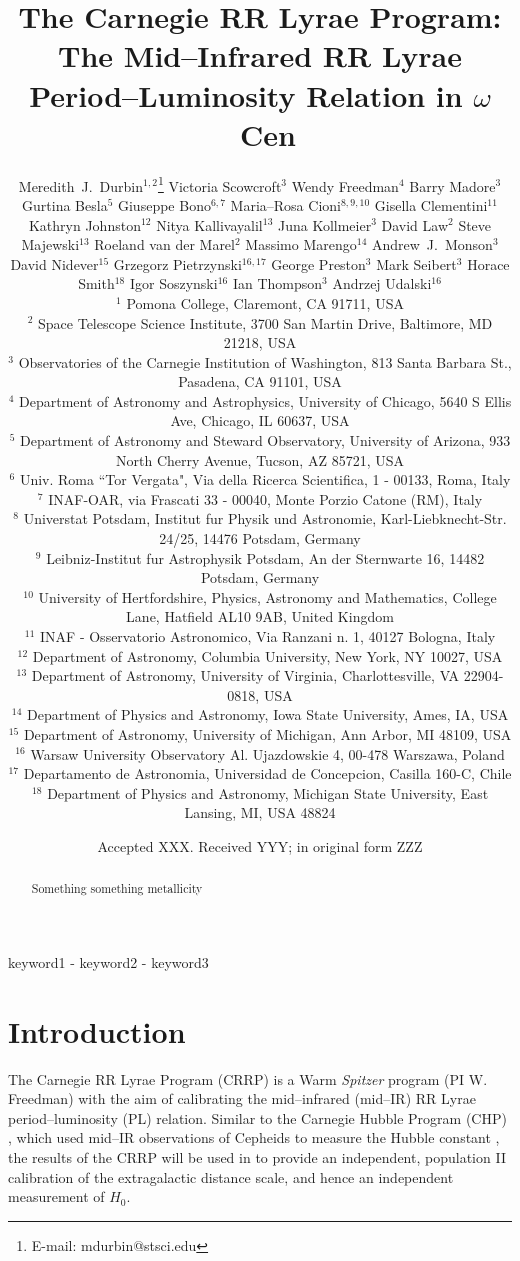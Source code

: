 \documentclass[a4paper,fleqn,usenatbib]{mnras}
\title[Mid--IR RR Lyrae PL Relation in $\omega$ Cen]{The Carnegie RR Lyrae Program: The Mid--Infrared RR Lyrae Period--Luminosity Relation in $\omega$~Cen}
\author[M.~J.~Durbin et al.]{Meredith~J.~Durbin$^{1,2}$\thanks{E-mail: mdurbin@stsci.edu}
Victoria Scowcroft$^{3}$
Wendy Freedman$^{4}$
Barry Madore$^{3}$
\newauthor Gurtina Besla$^{5}$ 
Giuseppe Bono$^{6, 7}$
Maria--Rosa Cioni$^{8, 9, 10}$
Gisella Clementini$^{11}$
\newauthor Kathryn Johnston$^{12}$
Nitya Kallivayalil$^{13}$
Juna Kollmeier$^{3}$
David Law$^{2}$
Steve Majewski$^{13}$
\newauthor Roeland van der Marel$^{2}$
Massimo Marengo$^{14}$
Andrew~J.~Monson$^{3}$
David Nidever$^{15}$ 
\newauthor
Grzegorz Pietrzynski$^{16, 17}$
George Preston$^{3}$
Mark Seibert$^{3}$
Horace Smith$^{18}$
\newauthor Igor Soszynski$^{16}$
Ian Thompson$^{3}$
Andrzej Udalski$^{16}$
\\
$^1$ Pomona College, Claremont, CA 91711, USA \\
$^2$ Space Telescope Science Institute, 3700 San Martin Drive, Baltimore, MD 21218, USA \\
$^3$ Observatories of the Carnegie Institution of Washington, 813 Santa Barbara St., Pasadena, CA 91101, USA \\
$^4$ Department of Astronomy and Astrophysics, University of Chicago, 5640 S Ellis Ave, Chicago, IL 60637, USA \\
$^5$ Department of Astronomy and Steward Observatory, University of Arizona, 933 North Cherry Avenue,   Tucson, AZ 85721, USA \\
$^6$ Univ. Roma ``Tor Vergata", Via della Ricerca Scientifica, 1 - 00133, Roma, Italy \\
$^7$ INAF-OAR, via Frascati 33 - 00040, Monte Porzio Catone (RM), Italy \\
$^8$ Universtat Potsdam, Institut fur Physik und Astronomie, Karl-Liebknecht-Str. 24/25, 14476 Potsdam, Germany \\
$^9$ Leibniz-Institut fur Astrophysik Potsdam, An der Sternwarte 16, 14482 Potsdam, Germany \\
$^{10}$ University of Hertfordshire, Physics, Astronomy and Mathematics, College Lane, Hatfield AL10 9AB, United Kingdom \\
$^{11}$ INAF - Osservatorio Astronomico, Via Ranzani n. 1, 40127 Bologna, Italy \\
$^{12}$ Department of Astronomy, Columbia University, New York, NY 10027, USA  \\
$^{13}$ Department of Astronomy, University of Virginia, Charlottesville, VA 22904-0818, USA \\
$^{14}$ Department of Physics and Astronomy, Iowa State University, Ames, IA, USA \\
$^{15}$ Department of Astronomy, University of Michigan, Ann Arbor, MI 48109, USA \\
$^{16}$ Warsaw University Observatory Al. Ujazdowskie 4, 00-478 Warszawa, Poland \\
$^{17}$ Departamento de Astronomia, Universidad de Concepcion, Casilla 160-C, Chile \\
$^{18}$ Department of Physics and Astronomy, Michigan State University, East Lansing, MI, USA 48824 \\
}
\date{Accepted XXX. Received YYY; in original form ZZZ}
\begin{document}
\label{firstpage}
\pagerange{\pageref{firstpage}-\pageref{lastpage}}
\maketitle

\begin{abstract}
Something something metallicity
\end{abstract}

\begin{keywords}
keyword1 - keyword2 - keyword3
\end{keywords}






\section{Introduction}
\label{sec:intro}

The Carnegie RR Lyrae Program (CRRP) is a Warm {\it Spitzer} program (PI W. Freedman) with the aim of calibrating the mid--infrared (mid--IR) RR Lyrae period--luminosity (PL) relation. Similar to the Carnegie Hubble Program (CHP) \citep{2011AJ....142..192F}, which used mid--IR observations of Cepheids to measure the Hubble constant \citep[$H_{0}$][]{2012ApJ...758...24F}, the results of the CRRP will be used in to provide an independent, population II calibration of the extragalactic distance scale, and hence an independent measurement of $H_{0}$. 
\end{document}
